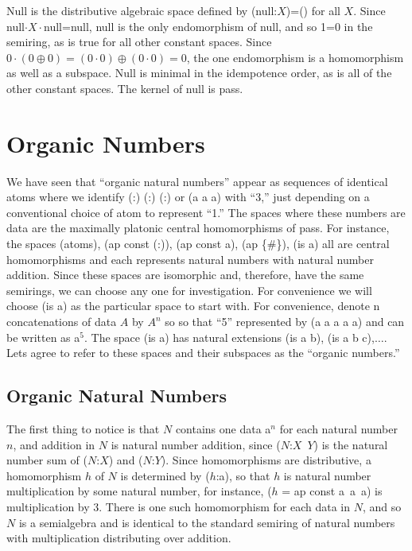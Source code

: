 \documentclass[11pt]{article}
\begin{document}
    Null is the distributive algebraic space defined by (null:$X$)=() for all $X$.  Since null$\cdot X\cdot$null=null, null is the only endomorphism 
of null, and so 1=0 in the semiring, as is true for all other constant spaces.  Since $0\cdot(0\oplus 0)=(0\cdot 0) \oplus (0\cdot 0)=0$, the one 
endomorphism is a homomorphism as well as a subspace. 
Null is minimal in the idempotence order, as is all of the 
other constant spaces.  The kernel of null is pass.  

\section{Organic Numbers}

      We have seen that ``organic natural numbers'' appear as sequences of identical atoms where we identify (:) (:) (:) or (a a a) with ``3,'' just depending 
 on a conventional choice of atom to represent ``1.''  The spaces where these numbers are data are the maximally platonic central homomorphisms of 
 pass.  For instance, the spaces (atoms), (ap const (:)), (ap const a), (ap \{\#\}), (is a) all are central homomorphisms and each represents natural numbers 
 with natural number addition.  Since these spaces are isomorphic and, therefore, have the same semirings, we can choose any one for investigation.  
 For convenience we will choose (is a) as the particular space to start with.  For convenience, denote n concatenations of data $A$ by $A^n$ so so that 
 ``5'' represented by (a a a a a) and can be written as a$^5$.  The space (is a) has natural extensions (is a b), (is a b c),$\dots$.  
 Lets agree to refer to these spaces and their subspaces as the ``organic numbers.'' 
      
\subsection{Organic Natural Numbers}     
     
     The first thing to notice is that $N$ contains one data a$^n$ for each natural number $n$, and addition in $N$ is natural number addition, 
since ($N$:$X$\ $Y$) is the natural number sum of ($N$:$X$) and ($N$:$Y$).  Since homomorphisms are distributive, a homomorphism $h$ of $N$ is determined by ($h$:a), so that $h$ is natural number multiplication by some natural number, 
for instance, ($h$ = ap const a\ a\ a) is multiplication by $3$.  There is one such homomorphism for each data in $N$, and so $N$ is a semialgebra and 
is identical to the standard semiring of natural numbers with multiplication distributing over addition.
     
\end{document}
